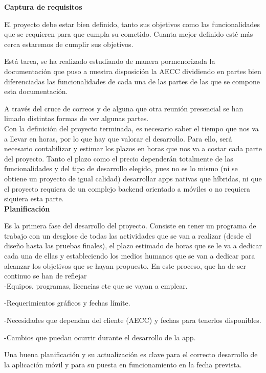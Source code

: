 \documentclass[../pfc.tex]{subfiles}
\begin{document}
	\textbf{Captura de requisitos}
	
	El proyecto debe estar bien definido, tanto sus objetivos como las funcionalidades que se requieren para que cumpla su cometido. Cuanta mejor definido esté más cerca estaremos de cumplir sus objetivos.
	
	Está tarea, se ha realizado estudiando de manera pormenorizada la documentación que puso a nuestra disposición la AECC dividiendo en partes bien diferenciadas las funcionalidades de cada una de las partes de las que se compone esta documentación.
	
	A través del cruce de correos y de alguna que otra reunión presencial se han limado distintas formas de ver algunas partes.\\
	
		
	Con la definición del proyecto terminada, es necesario saber el tiempo que nos va a llevar en horas, por lo que hay que valorar el desarrollo. Para ello, será necesario contabilizar y estimar los plazos en horas que nos va a costar cada parte del proyecto. Tanto el plazo como el precio dependerán totalmente de las funcionalidades y del tipo de desarrollo elegido, pues no es lo mismo (ni se obtiene un proyecto de igual calidad) desarrollar apps nativas que híbridas, ni que el proyecto requiera de un complejo backend orientado a móviles o no requiera siquiera esta parte.\\
	
	\textbf{Planificación} 
		
	Es la primera fase del desarrollo del proyecto. Consiste en tener un programa de trabajo con un desglose de todas las actividades que se van a realizar (desde el diseño hasta las pruebas finales), el plazo estimado de horas que se le va a dedicar cada una de ellas y estableciendo los medios humanos que se van a dedicar para alcanzar los objetivos que se hayan propuesto. En este proceso, que ha de ser continuo se han de reflejar\\
	
	-Equipos, programas, licencias etc que se vayan a emplear.
	
	-Requerimientos gráficos y fechas límite.
	
	-Necesidades que dependan del cliente (AECC) y fechas para tenerlos disponibles.
	
	-Cambios que puedan ocurrir durante el desarrollo de la app.
	
	Una buena planificación y su actualización es clave para el correcto desarrollo de la aplicación móvil y para su puesta en funcionamiento en la fecha prevista.\\  
	
\end{document}
